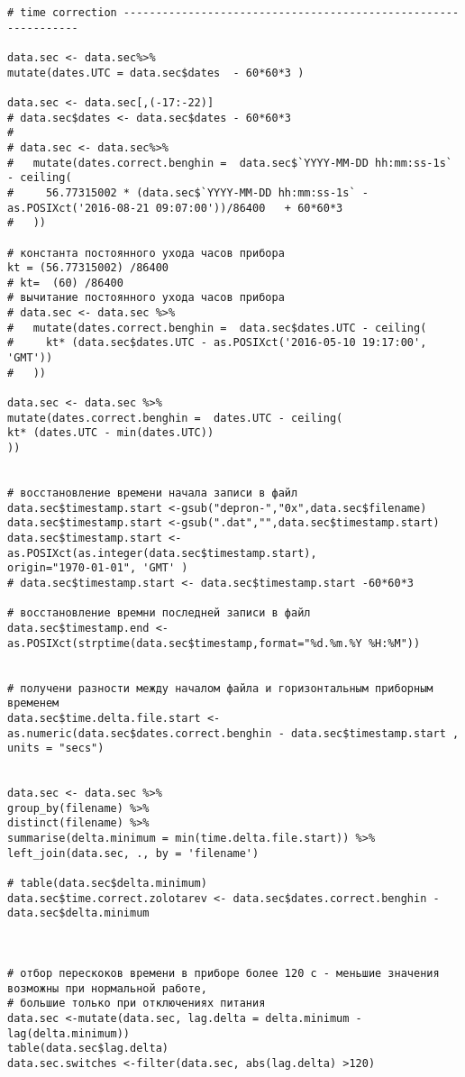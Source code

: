 \begin{lstlisting}[language={Renhanced}]
# time correction ---------------------------------------------------------------

data.sec <- data.sec%>%
mutate(dates.UTC = data.sec$dates  - 60*60*3 )

data.sec <- data.sec[,(-17:-22)]
# data.sec$dates <- data.sec$dates - 60*60*3
# 
# data.sec <- data.sec%>%
#   mutate(dates.correct.benghin =  data.sec$`YYYY-MM-DD hh:mm:ss-1s` - ceiling(
#     56.77315002 * (data.sec$`YYYY-MM-DD hh:mm:ss-1s` - as.POSIXct('2016-08-21 09:07:00'))/86400   + 60*60*3
#   ))

# константа постоянного ухода часов прибора
kt = (56.77315002) /86400
# kt=  (60) /86400
# вычитание постоянного ухода часов прибора
# data.sec <- data.sec %>%
#   mutate(dates.correct.benghin =  data.sec$dates.UTC - ceiling(
#     kt* (data.sec$dates.UTC - as.POSIXct('2016-05-10 19:17:00', 'GMT'))
#   ))

data.sec <- data.sec %>%
mutate(dates.correct.benghin =  dates.UTC - ceiling(
kt* (dates.UTC - min(dates.UTC))
))


# восстановление времени начала записи в файл
data.sec$timestamp.start <-gsub("depron-","0x",data.sec$filename)
data.sec$timestamp.start <-gsub(".dat","",data.sec$timestamp.start)
data.sec$timestamp.start <- as.POSIXct(as.integer(data.sec$timestamp.start), 
origin="1970-01-01", 'GMT' )
# data.sec$timestamp.start <- data.sec$timestamp.start -60*60*3

# восстановление времни последней записи в файл
data.sec$timestamp.end <- as.POSIXct(strptime(data.sec$timestamp,format="%d.%m.%Y %H:%M"))


# получени разности между началом файла и горизонтальным приборным временем
data.sec$time.delta.file.start <- as.numeric(data.sec$dates.correct.benghin - data.sec$timestamp.start ,
units = "secs") 


data.sec <- data.sec %>%
group_by(filename) %>%
distinct(filename) %>%
summarise(delta.minimum = min(time.delta.file.start)) %>%
left_join(data.sec, ., by = 'filename')

# table(data.sec$delta.minimum)
data.sec$time.correct.zolotarev <- data.sec$dates.correct.benghin - data.sec$delta.minimum 



# отбор перескоков времени в приборе более 120 с - меньшие значения возможны при нормальной работе, 
# большие только при отключениях питания
data.sec <-mutate(data.sec, lag.delta = delta.minimum - lag(delta.minimum))
table(data.sec$lag.delta)
data.sec.switches <-filter(data.sec, abs(lag.delta) >120)




\end{lstlisting}
